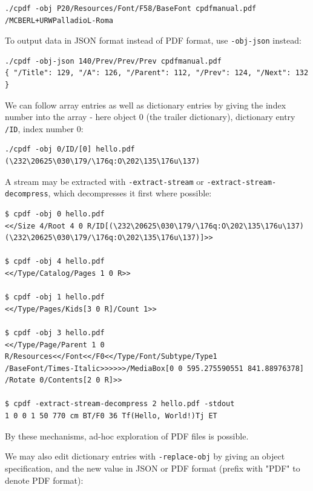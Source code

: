 \documentclass{book}
\begin{document}
{\small\begin{verbatim}
./cpdf -obj P20/Resources/Font/F58/BaseFont cpdfmanual.pdf
/MCBERL+URWPalladioL-Roma
\end{verbatim}}

\noindent To output data in JSON format instead of PDF format, use \texttt{-obj-json} instead:

{\small\begin{verbatim}
./cpdf -obj-json 140/Prev/Prev/Prev cpdfmanual.pdf
{ "/Title": 129, "/A": 126, "/Parent": 112, "/Prev": 124, "/Next": 132 }
\end{verbatim}}

\noindent We can follow array entries as well as dictionary entries by giving the index number into the array - here object 0 (the trailer dictionary), dictionary entry \texttt{/ID}, index number 0:

{\small\begin{verbatim}
./cpdf -obj 0/ID/[0] hello.pdf
(\232\20625\030\179/\176q:O\202\135\176u\137)
\end{verbatim}}

\noindent A stream may be extracted with \texttt{-extract-stream} or \texttt{-extract-stream-decompress}, which decompresses it first where possible:

{\small\begin{verbatim}
$ cpdf -obj 0 hello.pdf
<</Size 4/Root 4 0 R/ID[(\232\20625\030\179/\176q:O\202\135\176u\137)
(\232\20625\030\179/\176q:O\202\135\176u\137)]>>

$ cpdf -obj 4 hello.pdf
<</Type/Catalog/Pages 1 0 R>>

$ cpdf -obj 1 hello.pdf
<</Type/Pages/Kids[3 0 R]/Count 1>>

$ cpdf -obj 3 hello.pdf
<</Type/Page/Parent 1 0 R/Resources<</Font<</F0<</Type/Font/Subtype/Type1
/BaseFont/Times-Italic>>>>>>/MediaBox[0 0 595.275590551 841.88976378]
/Rotate 0/Contents[2 0 R]>>

$ cpdf -extract-stream-decompress 2 hello.pdf -stdout
1 0 0 1 50 770 cm BT/F0 36 Tf(Hello, World!)Tj ET
\end{verbatim}}

\noindent By these mechanisms, ad-hoc exploration of PDF files is possible.

We may also edit dictionary entries with \texttt{-replace-obj} by giving an object specification, and the new value in JSON or PDF format (prefix with "PDF" to denote PDF format):
\end{document}
